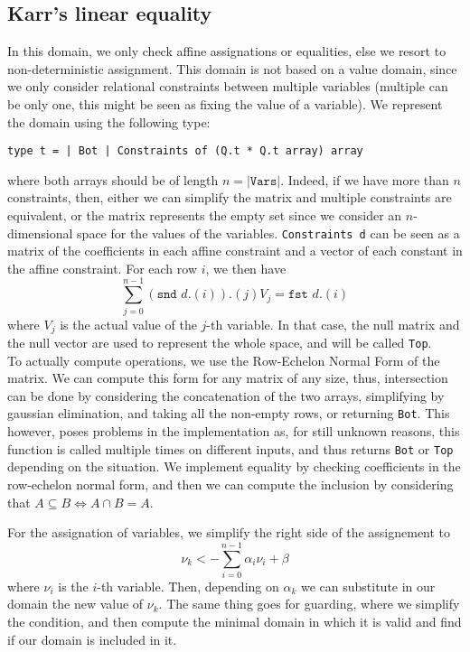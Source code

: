 \documentclass[12pt,a4paper]{article}
\begin{document}
\subsection{Karr's linear equality}
In this domain, we only check affine assignations or equalities, else we resort to non-deterministic assignment. This domain is not based on a value domain, since we only consider relational constraints between multiple variables (multiple can be only one, this might be seen as fixing the value of a variable).
We represent the domain using the following type:
\begin{center}
	\texttt{type t = | Bot | Constraints of (Q.t * Q.t array) array}
\end{center}
where both arrays should be of length $n = |\texttt{Vars}|$.
Indeed, if we have more than $n$ constraints, then, either we can simplify the matrix and multiple constraints are equivalent, or the matrix represents the empty set since we consider an $n$-dimensional space for the values of the variables.
\texttt{Constraints d} can be seen as a matrix of the coefficients in each affine constraint and a vector of each constant in the affine constraint. For each row $i$, we then have
\begin{equation*}
    \sum_{j = 0}^{n - 1} (\texttt{snd } d.(i)).(j) V_{j} = \texttt{fst } d.(i)
\end{equation*}
where $V_{j}$ is the actual value of the $j$-th variable.
In that case, the null matrix and the null vector are used to represent the whole space, and will be called \texttt{Top}.\\
To actually compute operations, we use the Row-Echelon Normal Form of the matrix.
We can compute this form for any matrix of any size, thus, intersection can be done by considering the concatenation of the two arrays, simplifying by gaussian elimination, and taking all the non-empty rows, or returning \texttt{Bot}.
This however, poses problems in the implementation as, for still unknown reasons, this function is called multiple times on different inputs, and thus returns \texttt{Bot} or \texttt{Top} depending on the situation.
We implement equality by checking coefficients in the row-echelon normal form, and then we can compute the inclusion by considering that $A \subseteq B \Leftrightarrow A \cap B = A$.

For the assignation of variables, we simplify the right side of the assignement to
\begin{equation*}
    \nu_{k} <- \sum_{i = 0}^{n - 1}\alpha_{i}\nu_{i} + \beta
\end{equation*}
where $\nu_{i}$ is the $i$-th variable.
Then, depending on $\alpha_{k}$ we can substitute in our domain the new value of $\nu_{k}$.
The same thing goes for guarding, where we simplify the condition, and then compute the minimal domain in which it is valid and find if our domain is included in it.
\end{document}
